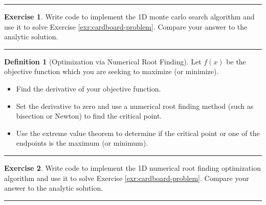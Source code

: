 \documentclass[
]{book}
\theoremstyle{definition}
\newtheorem{definition}{Definition}[chapter]
\theoremstyle{definition}
\theoremstyle{definition}
\newtheorem{exercise}{Exercise}[chapter]
\theoremstyle{remark}
\begin{document}
\begin{center}\rule{0.5\linewidth}{0.5pt}\end{center}

\begin{exercise}
\protect\hypertarget{exr:unnamed-chunk-197}{}{\label{exr:unnamed-chunk-197} }Write code to implement the 1D monte carlo search algorithm and use it to solve Exercise \ref{exr:cardboard-problem}. Compare your answer to the analytic solution.
\end{exercise}

\begin{center}\rule{0.5\linewidth}{0.5pt}\end{center}

\begin{definition}[Optimization via Numerical Root Finding]
\protect\hypertarget{def:unnamed-chunk-198}{}{\label{def:unnamed-chunk-198} {} }Let \(f(x)\) be the objective function which you are seeking to maximize (or minimize).

\begin{itemize}
\item
  Find the derivative of your objective function.
\item
  Set the derivative to zero and use a numerical root finding method
  (such as bisection or Newton) to find the critical point.
\item
  Use the extreme value theorem to determine if the critical point or
  one of the endpoints is the maximum (or minimum).
\end{itemize}
\end{definition}

\begin{center}\rule{0.5\linewidth}{0.5pt}\end{center}

\begin{exercise}
\protect\hypertarget{exr:unnamed-chunk-199}{}{\label{exr:unnamed-chunk-199} }Write code to implement the 1D numerical root finding optimization algorithm and use it to solve Exercise \ref{exr:cardboard-problem}. Compare your answer to the analytic solution.
\end{exercise}

\begin{center}\rule{0.5\linewidth}{0.5pt}\end{center}
\end{document}
